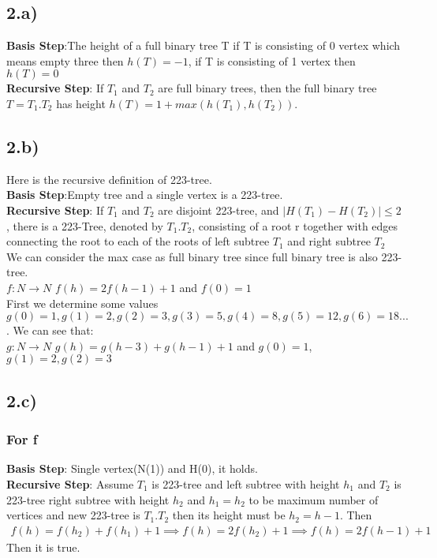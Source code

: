\documentclass[12pt]{article}
\begin{document}
\subsection*{2.a)}
\textbf{Basis Step}:The height of a full binary tree T if T is consisting of 0 vertex which means empty three then $h(T)=-1$, if T is consisting of 1 vertex then $h(T)=0$ \\
\textbf{Recursive Step}: If $T_1$ and $T_2$ are full binary trees, then the full binary tree $T=T_1.T_2$ has height $h(T)=1+max(h(T_1),h(T_2))$.
\subsection*{2.b)}
Here is the recursive definition of 223-tree. \\
\textbf{Basis Step}:Empty tree and a single vertex is a 223-tree.  \\
\textbf{Recursive Step}: If $T_1$ and $T_2$ are disjoint 223-tree, and $|H(T_1)-H(T_2)|\leq 2$, there is a 223-Tree, denoted by $T_1.T_2$, consisting of a root r together with edges connecting the root to each of the roots of left subtree $T_1$ and right subtree $T_2$ \\
We can consider the max case as full binary tree since full binary tree is also 223-tree. \\
$f:N\to N$ $f(h)=2f(h-1)+1$ and $f(0) = 1$ \\
First we determine some values $g(0)=1,g(1)=2,g(2)=3,g(3)=5,g(4)=8,g(5)=12,g(6)=18...$. We can see that: \\
$g:N\to N$ $g(h) = g(h-3)+g(h-1)+1$ and $g(0)=1$, $g(1)=2, g(2)=3$
\subsection*{2.c)}
\subsubsection*{For f} 
\textbf{Basis Step}: Single vertex(N(1)) and H(0), it holds. \\
\textbf{Recursive Step}: Assume $T_1$ is 223-tree and left subtree with height $h_1$ and $T_2$ is 223-tree right subtree with height $h_2$ and $h_1= h_2$ to be maximum number of vertices and new 223-tree is $T_1.T_2$ then its height must be $h_2=h-1$. Then
\begin{equation} 
\begin{split} 
    f(h) = f(h_2)+f(h_1) +1 \implies f(h)=2f(h_2) +1 \implies f(h) = 2f(h-1)+1
\end{split}
\end{equation} 
Then it is true.
\end{document}
